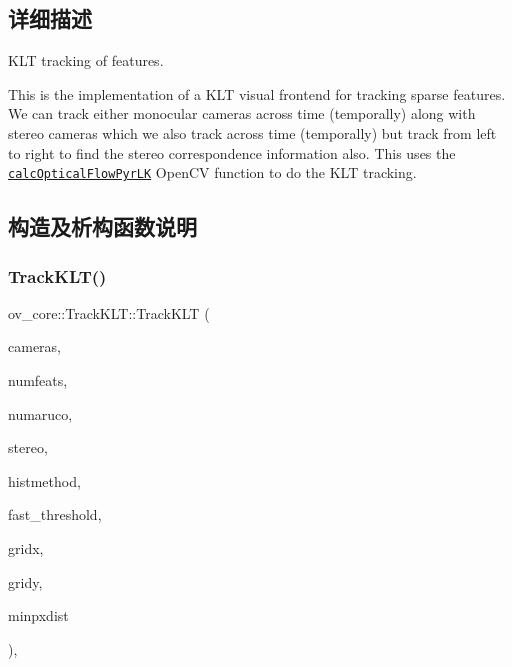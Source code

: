 \subsection{详细描述}
K\+LT tracking of features. 

This is the implementation of a K\+LT visual frontend for tracking sparse features. We can track either monocular cameras across time (temporally) along with stereo cameras which we also track across time (temporally) but track from left to right to find the stereo correspondence information also. This uses the \href{https://github.com/opencv/opencv/blob/master/modules/video/src/lkpyramid.cpp}{\tt calc\+Optical\+Flow\+Pyr\+LK} Open\+CV function to do the K\+LT tracking. 

\subsection{构造及析构函数说明}
\mbox{\label{classov__core_1_1TrackKLT_acb59382fb0893c546e612fa20ca0672b}} 
\subsubsection{\texorpdfstring{Track\+K\+L\+T()}{TrackKLT()}}
{\footnotesize\ttfamily ov\+\_\+core\+::\+Track\+K\+L\+T\+::\+Track\+K\+LT (\begin{DoxyParamCaption}\item[{std\+::unordered\+\_\+map$<$ size\+\_\+t, std\+::shared\+\_\+ptr$<$ \hyperlink{classov__core_1_1CamBase}{Cam\+Base} $>$$>$}]{cameras,  }\item[{int}]{numfeats,  }\item[{int}]{numaruco,  }\item[{bool}]{stereo,  }\item[{\hyperlink{classov__core_1_1TrackBase_aa4b34a5dce99b59522d57bf9278c9a1a}{Histogram\+Method}}]{histmethod,  }\item[{int}]{fast\+\_\+threshold,  }\item[{int}]{gridx,  }\item[{int}]{gridy,  }\item[{int}]{minpxdist }\end{DoxyParamCaption})\hspace{0.3cm}{\ttfamily [inline]}, {\ttfamily [explicit]}}



